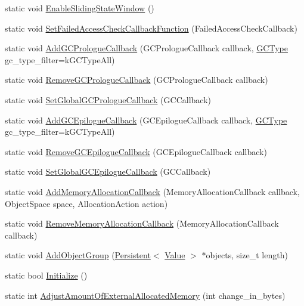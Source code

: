\begin{DoxyCompactItemize}
\item 
static void \hyperlink{classv8_1_1_v8_aa91df5fe1bb98b87952ef4bbf0aceb96}{Enable\+Sliding\+State\+Window} ()
\item 
static void \hyperlink{classv8_1_1_v8_aa6ed646d43360c209881871b3ac747aa}{Set\+Failed\+Access\+Check\+Callback\+Function} (Failed\+Access\+Check\+Callback)
\item 
static void \hyperlink{classv8_1_1_v8_a49c016f17c67f700387f801b2b29b5ab}{Add\+G\+C\+Prologue\+Callback} (G\+C\+Prologue\+Callback callback, \hyperlink{namespacev8_ac109d6f27e0c0f9ef4e98bcf7a806cf2}{G\+C\+Type} gc\+\_\+type\+\_\+filter=k\+G\+C\+Type\+All)
\item 
static void \hyperlink{classv8_1_1_v8_a7cdceb9c8ea5cd0887f69fd3bd97193f}{Remove\+G\+C\+Prologue\+Callback} (G\+C\+Prologue\+Callback callback)
\item 
static void \hyperlink{classv8_1_1_v8_a503e14a77e922775bd88bc2e19e19886}{Set\+Global\+G\+C\+Prologue\+Callback} (G\+C\+Callback)
\item 
static void \hyperlink{classv8_1_1_v8_a37aadf3536c772eb5bbf67fa7822679a}{Add\+G\+C\+Epilogue\+Callback} (G\+C\+Epilogue\+Callback callback, \hyperlink{namespacev8_ac109d6f27e0c0f9ef4e98bcf7a806cf2}{G\+C\+Type} gc\+\_\+type\+\_\+filter=k\+G\+C\+Type\+All)
\item 
static void \hyperlink{classv8_1_1_v8_a3382e4dae9865909242a8ee0b1d6bf77}{Remove\+G\+C\+Epilogue\+Callback} (G\+C\+Epilogue\+Callback callback)
\item 
static void \hyperlink{classv8_1_1_v8_a94bac5e06a99141c5629842e18558cfe}{Set\+Global\+G\+C\+Epilogue\+Callback} (G\+C\+Callback)
\item 
static void \hyperlink{classv8_1_1_v8_ac9718f8dc3f3c498bf07282eb7c1618e}{Add\+Memory\+Allocation\+Callback} (Memory\+Allocation\+Callback callback, Object\+Space space, Allocation\+Action action)
\item 
static void \hyperlink{classv8_1_1_v8_a1e181f5bf42174b60cd5f4e3a0c20ce8}{Remove\+Memory\+Allocation\+Callback} (Memory\+Allocation\+Callback callback)
\item 
static void \hyperlink{classv8_1_1_v8_a4744037e970e3b3bafcc3cac03a5967f}{Add\+Object\+Group} (\hyperlink{classv8_1_1_persistent}{Persistent}$<$ \hyperlink{classv8_1_1_value}{Value} $>$ $\ast$objects, size\+\_\+t length)
\item 
static bool \hyperlink{classv8_1_1_v8_a40daec93ce44bdd922567fc121be9db8}{Initialize} ()
\item 
static int \hyperlink{classv8_1_1_v8_a8e6f2e66c028d1ffa3f5e8a799790bc5}{Adjust\+Amount\+Of\+External\+Allocated\+Memory} (int change\+\_\+in\+\_\+bytes)

\end{DoxyCompactItemize}
